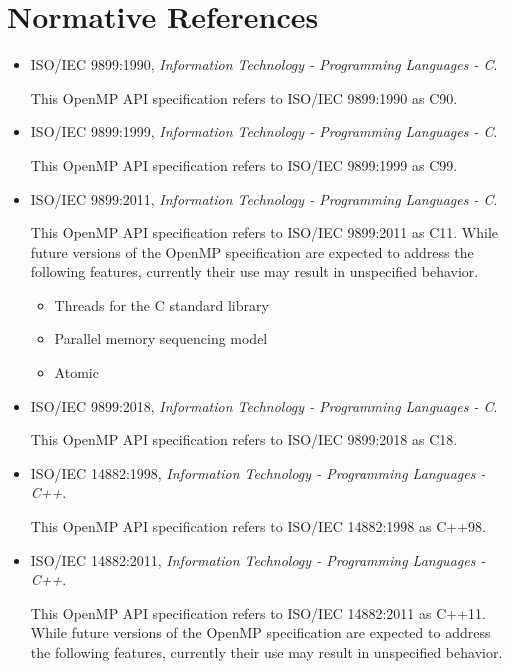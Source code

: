 \section{Normative References}
\label{sec:normative references}
\begin{itemize}
\item ISO/IEC 9899:1990, \textsl{Information Technology - Programming Languages - C}.

This OpenMP API specification refers to ISO/IEC 9899:1990 as C90.

\item ISO/IEC 9899:1999, \textsl{Information Technology - Programming Languages - C}.

This OpenMP API specification refers to ISO/IEC 9899:1999 as C99.

\item ISO/IEC 9899:2011, \textsl{Information Technology - Programming Languages - C}.

This OpenMP API specification refers to ISO/IEC 9899:2011 as C11.
While future versions of the OpenMP specification are expected to 
address the following features, currently their use may result in 
unspecified behavior.

\begin{itemize}
\item Threads for the C standard library
\item Parallel memory sequencing model
\item Atomic
\end{itemize}

\item ISO/IEC 9899:2018, \textsl{Information Technology - Programming Languages - C}.

This OpenMP API specification refers to ISO/IEC 9899:2018 as C18.

\item ISO/IEC 14882:1998, \textsl{Information Technology - Programming Languages - C++}.

This OpenMP API specification refers to ISO/IEC 14882:1998 as C++98.

\item ISO/IEC 14882:2011, \textsl{Information Technology - Programming Languages - C++}.

This OpenMP API specification refers to ISO/IEC 14882:2011 as C++11. 
While future versions of the OpenMP specification are expected to
address the following features, currently their use may result in
unspecified behavior.


\end{itemize}
